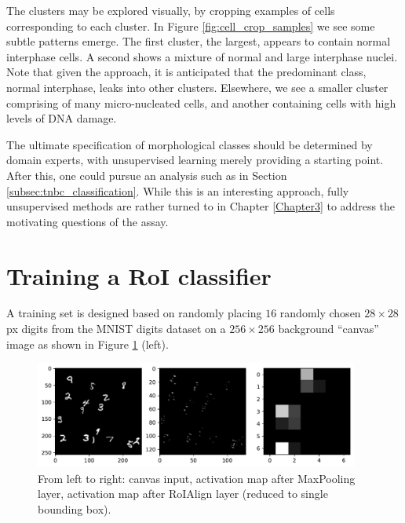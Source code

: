 
The clusters may be explored visually, by cropping examples of cells corresponding to each cluster. In Figure \ref{fig:cell_crop_samples} we see some subtle patterns emerge. The first cluster, the largest, appears to contain normal interphase cells. A second shows a mixture of normal and large interphase nuclei. Note that given the approach, it is anticipated that the predominant class, normal interphase, leaks into other clusters.   Elsewhere, we see a smaller cluster comprising of many micro-nucleated cells, and another containing cells with high levels of DNA damage.

The ultimate specification of morphological classes should be determined by domain experts, with unsupervised learning merely providing a starting point. After this, one could pursue an analysis such as in Section \ref{subsec:tnbc_classification}. While this is an interesting approach, fully unsupervised methods are rather turned to in Chapter \ref{Chapter3} to address the motivating questions of the assay.

\section{Training a RoI classifier}
\label{sec:training_roi_classifier}

A training set is designed based on randomly placing $16$ randomly chosen $28 \times 28$px digits from the MNIST digits dataset on a $256 \times 256$ background ``canvas'' image as shown in Figure \ref{fig:roi_layers} (left).

\begin{figure}[h]
\centering
\includegraphics[width=0.95\textwidth]{img/roi_layers_full.pdf}
\caption{From left to right: canvas input, activation map after MaxPooling layer, activation map after RoIAlign layer (reduced to single bounding box).}
\label{fig:roi_layers}
\end{figure}

